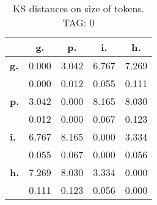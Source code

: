 \begin{table}[h!]
\begin{center}
\begin{tabular}{| l || c | c | c | c |}\hline
 & {\bf g.} & {\bf p.} & {\bf i.} & {\bf h.} \\\hline\hline
{\bf g.} & 0.000 & 3.042 & 6.767 & 7.269 \\
{\bf } & 0.000 & 0.012 & 0.055 & 0.111 \\\hline
{\bf p.} & 3.042 & 0.000 & 8.165 & 8.030 \\
{\bf } & 0.012 & 0.000 & 0.067 & 0.123 \\\hline
{\bf i.} & 6.767 & 8.165 & 0.000 & 3.334 \\
{\bf } & 0.055 & 0.067 & 0.000 & 0.056 \\\hline
{\bf h.} & 7.269 & 8.030 & 3.334 & 0.000 \\
{\bf } & 0.111 & 0.123 & 0.056 & 0.000 \\\hline
\end{tabular}
\caption{KS distances on size of tokens. TAG: 0}
\end{center}
\end{table}